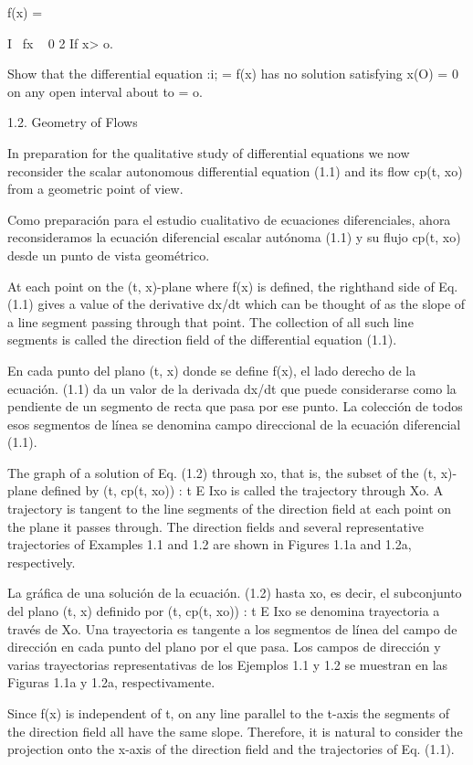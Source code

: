 \documentclass[]{article}
\begin{document}
f(x) = {I ~fx ~ 0
2 If x> o.

Show that the differential equation :i; = f(x) has no solution satisfying x(O) = 0 on any open interval about to = o.

1.2. Geometry of Flows

In preparation for the qualitative study of differential equations we now reconsider the scalar autonomous differential equation (1.1) and its flow cp(t, xo) from a geometric point of view.

Como preparación para el estudio cualitativo de ecuaciones diferenciales, ahora reconsideramos la ecuación diferencial escalar autónoma (1.1) y su flujo cp(t, xo) desde un punto de vista geométrico.

At each point on the (t, x)-plane where f(x) is defined, the righthand side of Eq. (1.1) gives a value of the derivative dx/dt which can be thought of as the slope of a line segment passing through that point. The collection of all such line segments is called the direction field of the differential equation (1.1).

En cada punto del plano (t, x) donde se define f(x), el lado derecho de la ecuación. (1.1) da un valor de la derivada dx/dt que puede considerarse como la pendiente de un segmento de recta que pasa por ese punto. La colección de todos esos segmentos de línea se denomina campo direccional de la ecuación diferencial (1.1).

The graph of a solution of Eq. (1.2) through xo, that is, the subset of the (t, x)-plane defined by {(t, cp(t, xo)) : t E Ixo } is called the trajectory through Xo. A trajectory is tangent to the line segments of the direction field at each point on the plane it passes through. The direction fields and several representative trajectories of Examples 1.1 and 1.2 are shown in Figures 1.1a and 1.2a, respectively.

La gráfica de una solución de la ecuación. (1.2) hasta xo, es decir, el subconjunto del plano (t, x) definido por {(t, cp(t, xo)) : t E Ixo } se denomina trayectoria a través de Xo. Una trayectoria es tangente a los segmentos de línea del campo de dirección en cada punto del plano por el que pasa. Los campos de dirección y varias trayectorias representativas de los Ejemplos 1.1 y 1.2 se muestran en las Figuras 1.1a y 1.2a, respectivamente.





Since f(x) is independent of t, on any line parallel to the t-axis the segments of the direction field all have the same slope. Therefore, it is natural to consider the projection onto the x-axis of the direction field and the trajectories of Eq. (1.1).

}
\end{document}

